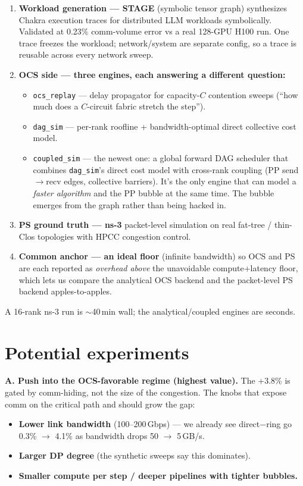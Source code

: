 \documentclass[11pt]{article}
\newcommand{\code}[1]{\texttt{#1}}
\begin{document}
\begin{enumerate}
\item \textbf{Workload generation --- STAGE} (symbolic tensor graph) synthesizes Chakra execution traces for distributed LLM workloads symbolically. Validated at 0.23\% comm-volume error vs a real 128-GPU H100 run. One trace freezes the workload; network/system are separate config, so a trace is reusable across every network sweep.
\item \textbf{OCS side --- three engines, each answering a different question:}
\begin{itemize}
\item \code{ocs\_replay} --- delay propagator for capacity-$C$ contention sweeps (``how much does a $C$-circuit fabric stretch the step'').
\item \code{dag\_sim} --- per-rank roofline + bandwidth-optimal direct collective cost model.
\item \code{coupled\_sim} --- the newest one: a global forward DAG scheduler that combines \code{dag\_sim}'s direct cost model with cross-rank coupling (PP send$\to$recv edges, collective barriers). It's the only engine that can model a \textit{faster algorithm} and the PP bubble at the same time. The bubble emerges from the graph rather than being hacked in.
\end{itemize}
\item \textbf{PS ground truth --- ns-3} packet-level simulation on real fat-tree / thin-Clos topologies with HPCC congestion control.
\item \textbf{Common anchor --- an ideal floor} (infinite bandwidth) so OCS and PS are each reported as \textit{overhead above} the unavoidable compute+latency floor, which lets us compare the analytical OCS backend and the packet-level PS backend apples-to-apples.
\end{enumerate}

A 16-rank ns-3 run is $\sim$40\,min wall; the analytical/coupled engines are seconds.

\section*{Potential experiments}

\textbf{A. Push into the OCS-favorable regime (highest value).} The +3.8\% is gated by comm-hiding, not the size of the congestion. The knobs that expose comm on the critical path and should grow the gap:
\begin{itemize}
\item \textbf{Lower link bandwidth} (100--200\,Gbps) --- we already see direct$-$ring go 0.3\% $\to$ 4.1\% as bandwidth drops 50 $\to$ 5\,GB/s.
\item \textbf{Larger DP degree} (the synthetic sweeps say this dominates).
\item \textbf{Smaller compute per step / deeper pipelines with tighter bubbles.}
\end{itemize}
\end{document}
